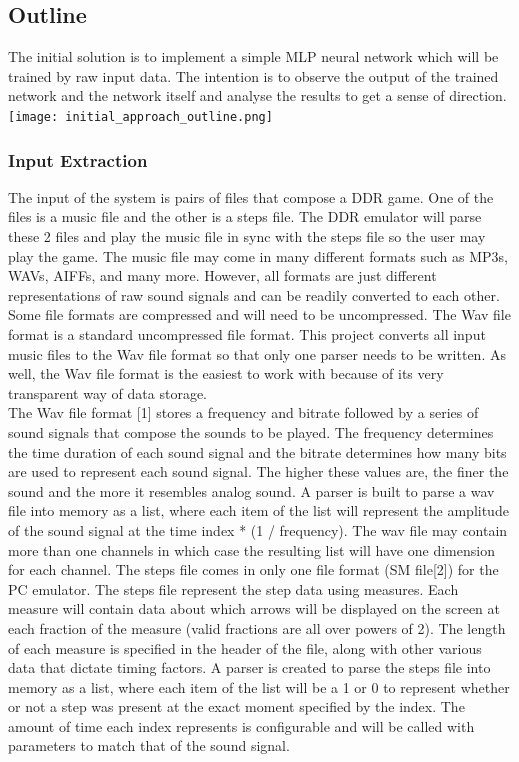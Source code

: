 


\subsection{Outline}

The initial solution is to implement a simple MLP neural network which will be trained by raw input data. The intention is to observe the output of the trained network and the network itself and analyse the results to get a sense of direction.\\

\texttt{[image: initial\_approach\_outline.png]}

\subsubsection{Input Extraction}

The input of the system is pairs of files that compose a DDR game. One of the files is a music file and the other is a steps file. The DDR emulator will parse these 2 files and play the music file in sync with the steps file so the user may play the game.
The music file may come in many different formats such as MP3s, WAVs, AIFFs, and many more. However, all formats are just different representations of raw sound signals and can be readily converted to each other. Some file formats are compressed and will need to be uncompressed. The Wav file format is a standard uncompressed file format. This project converts all input music files to the Wav file format so that only one parser needs to be written. As well, the Wav file format is the easiest to work with because of its very transparent way of data storage.\\

The Wav file format [1] stores a frequency and bitrate followed by a series of sound signals that compose the sounds to be played. The frequency determines the time duration of each sound signal and the bitrate determines how many bits are used to represent each sound signal. The higher these values are, the finer the sound and the more it resembles analog sound. A parser is built to parse a wav file into memory as a list, where each item of the list will represent the amplitude of the sound signal at the time index * (1 / frequency). The wav file may contain more than one channels in which case the resulting list will have one dimension for each channel.
The steps file comes in only one file format (SM file[2]) for the PC emulator. The steps file represent the step data using measures. Each measure will contain data about which arrows will be displayed on the screen at each fraction of the measure (valid fractions are all over powers of 2). The length of each measure is specified in the header of the file, along with other various data that dictate timing factors. A parser is created to parse the steps file into memory as a list, where each item of the list will be a 1 or 0 to represent whether or not a step was present at the exact moment specified by the index. The amount of time each index represents is configurable and will be called with parameters to match that of the sound signal.\\

